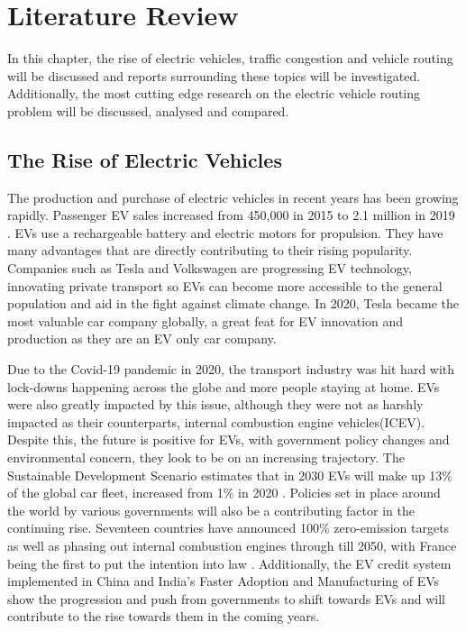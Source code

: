 \documentclass[11pt]{report}
\begin{document}
\newpage

\chapter{Literature Review}

\newpage

\noindent In this chapter, the rise of electric vehicles, traffic congestion and vehicle routing will be discussed and reports surrounding these topics will be investigated. Additionally, the most cutting edge research on the electric vehicle routing problem will be discussed, analysed and compared.

\section{The Rise of Electric Vehicles}

The production and purchase of electric vehicles in recent years has been growing rapidly. Passenger EV sales increased from 450,000 in 2015 to 2.1 million in 2019 \autocite{bnefEVReport}. EVs use a rechargeable battery and electric motors for propulsion. They have many advantages that are directly contributing to their rising popularity. Companies such as Tesla and Volkswagen are progressing EV technology, innovating private transport so EVs can become more accessible to the general population and aid in the fight against climate change. In 2020, Tesla became the most valuable car company globally, a great feat for EV innovation and production as they are an EV only car company.

Due to the Covid-19 pandemic in 2020, the transport industry was hit hard with lock-downs happening across the globe and more people staying at home. EVs were also greatly impacted by this issue, although they were not as harshly impacted as their counterparts, internal combustion engine vehicles(ICEV)\autocite{IEA2020CovidReport}. Despite this, the future is positive for EVs, with government policy changes and environmental concern, they look to be on an increasing trajectory. The Sustainable Development Scenario estimates that in 2030 EVs will make up 13\% of the global car fleet, increased from 1\% in 2020 \autocite{IEA2020EVReport}.  Policies set in place around the world by various governments will also be a contributing factor in the continuing rise. Seventeen countries have announced 100\% zero-emission targets as well as phasing out internal combustion engines through till 2050, with France being the first to put the intention into law \autocite{IEA2020GlobalEV}. Additionally, the EV credit system implemented in China and India's Faster Adoption and Manufacturing of EVs \autocite{bnefEVReport} show the progression and push from governments to shift towards EVs and will contribute to the rise towards them in the coming years. 
\end{document}
